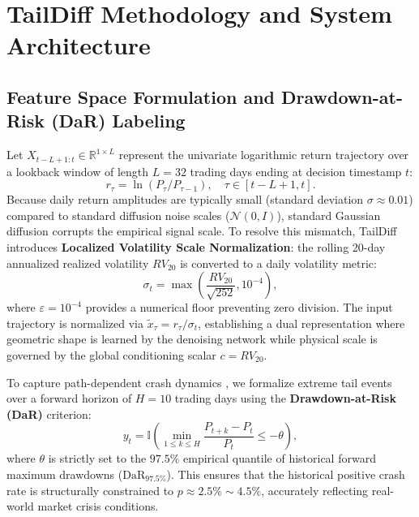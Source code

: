 \documentclass[preprint,12pt,authoryear]{elsarticle}
\begin{document}
\section{TailDiff Methodology and System Architecture}
\label{sec:methodology}

\subsection{Feature Space Formulation and Drawdown-at-Risk (DaR) Labeling}
Let $X_{t-L+1:t} \in \mathbb{R}^{1 \times L}$ represent the univariate logarithmic return trajectory over a lookback window of length $L = 32$ trading days ending at decision timestamp $t$:
\begin{equation}
    r_\tau = \ln(P_\tau / P_{\tau-1}), \quad \tau \in [t-L+1, t].
\end{equation}
Because daily return amplitudes are typically small (standard deviation $\sigma \approx 0.01$) compared to standard diffusion noise scales ($\mathcal{N}(0, I)$), standard Gaussian diffusion corrupts the empirical signal scale. To resolve this mismatch, TailDiff introduces \textbf{Localized Volatility Scale Normalization}: the rolling 20-day annualized realized volatility $RV_{20}$ is converted to a daily volatility metric:
\begin{equation}
    \sigma_t = \max\left( \frac{RV_{20}}{\sqrt{252}}, 10^{-4} \right),
    \label{eq:vol_norm}
\end{equation}
where $\varepsilon = 10^{-4}$ provides a numerical floor preventing zero division. The input trajectory is normalized via $\tilde{x}_\tau = r_\tau / \sigma_t$, establishing a dual representation where geometric shape is learned by the denoising network while physical scale is governed by the global conditioning scalar $c = RV_{20}$.

To capture path-dependent crash dynamics \citep{lopez2018advances}, we formalize extreme tail events over a forward horizon of $H = 10$ trading days using the \textbf{Drawdown-at-Risk (DaR)} criterion:
\begin{equation}
    y_t = \mathbb{I}\left( \min_{1 \le k \le H} \frac{P_{t+k} - P_t}{P_t} \le -\theta \right),
    \label{eq:dar_label}
\end{equation}
where $\theta$ is strictly set to the $97.5\%$ empirical quantile of historical forward maximum drawdowns ($\text{DaR}_{97.5\%}$). This ensures that the historical positive crash rate is structurally constrained to $p \approx 2.5\% \sim 4.5\%$, accurately reflecting real-world market crisis conditions.
\end{document}
